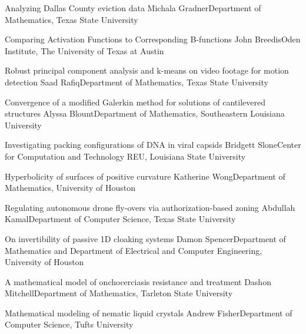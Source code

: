 \begin{postersPU}

\item\poster %
{Analyzing Dallas County eviction data}
{Michala Gradner}{Department of Mathematics, Texas State University}

\item\poster %
{Comparing Activation Functions to Corresponding B-functions}
{John Breedis}{Oden Institute, The University of Texas at Austin}

\item\poster %
{Robust principal component analysis and k-means on video footage for motion detection}
{Saad Rafiq}{Department of Mathematics, Texas State University}

\item\poster %
{Convergence of a modified Galerkin method for solutions of cantilevered structures}
{Alyssa Blount}{Department of Mathematics, Southeastern Louisiana University}

\item\poster %
{Investigating packing configurations of DNA in viral capsids}
{Bridgett Slone}{Center for Computation and Technology REU, Louisiana State University}

\item\poster %
{Hyperbolicity of surfaces of positive curvature}
{Katherine Wong}{Department of Mathematics, University of Houston}

\item\poster %
{Regulating autonomous drone fly-overs via authorization-based zoning}
{Abdullah Kamal}{Department of Computer Science, Texas State University}

\item\poster %
{On invertibility of passive 1D cloaking systems}
{Damon Spencer}{Department of Mathematics and Department of Electrical and Computer Engineering, University of Houston}

\item\poster %
{A mathematical model of onchocerciasis resistance and treatment}
{Dashon Mitchell}{Department of Mathematics, Tarleton State University}

\item\poster %
{Mathematical modeling of nematic liquid crystals}
{Andrew Fisher}{Department of Computer Science, Tufts University}


\end{postersPU}
